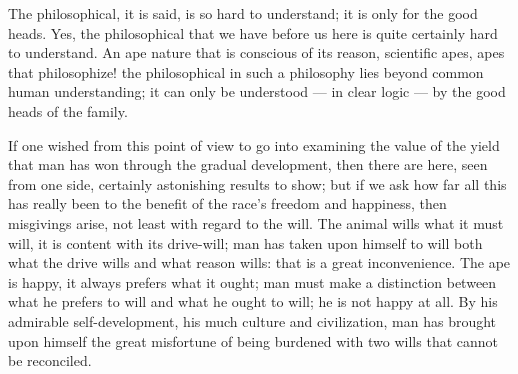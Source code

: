 \documentclass[12pt,a4paper,openany]{book}
\newcommand{\opage}[1]{\marginnote{\footnotesize\textit{[#1]}}}
\begin{document}
\setcounter{footnote}{0}%
\opage{37}The philosophical, it is said, is so hard to understand; it is only for the good heads. Yes, the philosophical that we have
before us here is quite certainly hard to understand. An ape nature that is conscious of its reason, scientific apes, apes that
philosophize! the philosophical in such a philosophy lies beyond common human understanding; it can only be understood --- in
clear logic --- by the good heads of the family.

If one wished from this point of view to go into examining the value of the yield that man has won through the gradual
development, then there are here, seen from one side, certainly astonishing results to show; but if we ask how far all this
has really been to the benefit of the race's freedom and happiness, then misgivings arise, not least with regard to the will.
The animal wills what it must will, it is content with its drive-will; man has taken upon himself to will both what the drive
wills and what reason wills: that is a great inconvenience. The ape is happy, it always prefers what it ought; man must make
a distinction between what he prefers to will and what he ought to will; he is not happy at all. By his admirable
self-development, his much culture and civilization, man has brought upon himself the great misfortune of being burdened with
two wills that cannot be reconciled.
\end{document}
